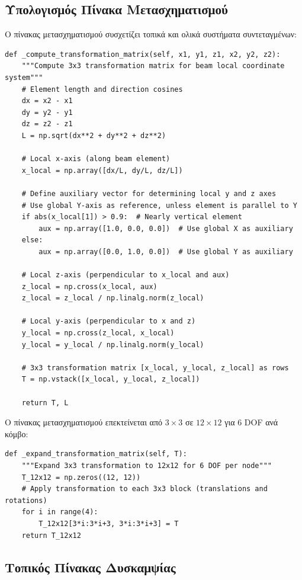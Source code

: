 \documentclass[12pt,a4paper]{article}
\begin{document}
\subsection{Υπολογισμός Πίνακα Μετασχηματισμού}

Ο πίνακας μετασχηματισμού συσχετίζει τοπικά και ολικά συστήματα συντεταγμένων:

\begin{lstlisting}[caption={Υπολογισμός Πίνακα Μετασχηματισμού}]
def _compute_transformation_matrix(self, x1, y1, z1, x2, y2, z2):
    """Compute 3x3 transformation matrix for beam local coordinate system"""
    # Element length and direction cosines
    dx = x2 - x1
    dy = y2 - y1
    dz = z2 - z1
    L = np.sqrt(dx**2 + dy**2 + dz**2)
    
    # Local x-axis (along beam element)
    x_local = np.array([dx/L, dy/L, dz/L])
    
    # Define auxiliary vector for determining local y and z axes
    # Use global Y-axis as reference, unless element is parallel to Y
    if abs(x_local[1]) > 0.9:  # Nearly vertical element
        aux = np.array([1.0, 0.0, 0.0])  # Use global X as auxiliary
    else:
        aux = np.array([0.0, 1.0, 0.0])  # Use global Y as auxiliary
    
    # Local z-axis (perpendicular to x_local and aux)
    z_local = np.cross(x_local, aux)
    z_local = z_local / np.linalg.norm(z_local)
    
    # Local y-axis (perpendicular to x and z)
    y_local = np.cross(z_local, x_local)
    y_local = y_local / np.linalg.norm(y_local)
    
    # 3x3 transformation matrix [x_local, y_local, z_local] as rows
    T = np.vstack([x_local, y_local, z_local])
    
    return T, L
\end{lstlisting}

Ο πίνακας μετασχηματισμού επεκτείνεται από $3 \times 3$ σε $12 \times 12$ για 6 DOF ανά κόμβο:

\begin{lstlisting}[caption={Επέκταση Πίνακα Μετασχηματισμού}]
def _expand_transformation_matrix(self, T):
    """Expand 3x3 transformation to 12x12 for 6 DOF per node"""
    T_12x12 = np.zeros((12, 12))
    # Apply transformation to each 3x3 block (translations and rotations)
    for i in range(4):
        T_12x12[3*i:3*i+3, 3*i:3*i+3] = T
    return T_12x12
\end{lstlisting}

\subsection{Τοπικός Πίνακας Δυσκαμψίας}
\end{document}
